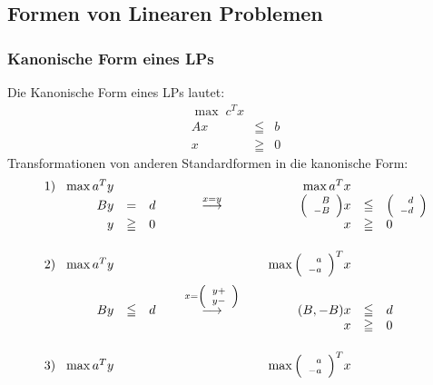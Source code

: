 \documentclass[12pt,titlepage,a4paper] {report}
\begin{document}
\subsection{Formen von Linearen Problemen}

\subsubsection{Kanonische Form eines LPs}

Die Kanonische Form eines LPs lautet:
\[\begin{array}{lcl}
\max\; c^{T}x\\
Ax&\leqq& b\\
x&\geqq& 0
\end{array}\]
Transformationen von anderen Standardformen in die kanonische Form:
\[\begin{array}{l@{\hspace{3mm}}rcl@{\hspace{8mm}}c@{\hspace{8mm}}rcl}
1)&\max  a^{T}y&&&&\max a^{T}x\\
&By&=&d&\stackrel{x=y}{\longrightarrow}&{\scriptsize\left(\begin{array}{r}B\\-B\\\end{array}
\right)}x&\leqq&{\scriptsize\left(\begin{array}{r}d\\-d\end{array}
\right)}\\
&y&\geqq& 0&&x&\geqq& 0\vspace{5mm}\\
2)&\max a^{T}y&&&&\max {\scriptsize\left(\begin{array}{r}a\\-a\end{array}\right)}^{T}x\vspace{2mm}\\
&By&\leqq&d&\stackrel{x={\scriptsize\left(\begin{array}{r}y+\\y-\end{array}
\right)}}{\longrightarrow}&(B, -B)x&\leqq& d\\
&&&&&x&\geqq& 0\vspace{5mm}\\
3)&\max a^{T}y&&&&\max
{\scriptsize\left(\begin{array}{r}a\\-a\end{array}\right)}^{T}x\vspace{2mm}\\

\end{array}\]
\end{document}
